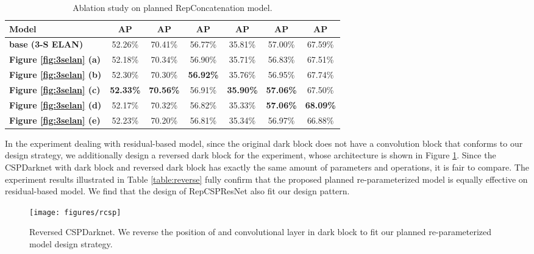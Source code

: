 \documentclass[10pt,twocolumn,letterpaper]{article}
\begin{document}
		
		
		\begin{table}[h]
			\centering
			\begin{threeparttable}[h]
				\footnotesize
				\caption{Ablation study on planned RepConcatenation model.}
				\label{table:stack}
				\setlength\tabcolsep{1.0pt}
				\begin{tabular}{lcccccc}
					\toprule
					\textbf{Model} & \textbf{AP} & \textbf{AP} & \textbf{AP} & \textbf{AP} & \textbf{AP} & \textbf{AP}  \\	
					\midrule
					\textbf{base (3-S ELAN)} & 52.26\% & 70.41\% & 56.77\% & 35.81\% & 57.00\% & 67.59\% \\
					\textbf{Figure \ref{fig:3selan} (a)} & 52.18\% & 70.34\% & 56.90\% & 35.71\% & 56.83\% & 67.51\% \\
					\textbf{Figure \ref{fig:3selan} (b)} & 52.30\% & 70.30\% & \textbf{56.92\%} & 35.76\% & 56.95\% & 67.74\% \\
					\textbf{Figure \ref{fig:3selan} (c)} & \textbf{52.33\%} & \textbf{70.56\%} & 56.91\% & \textbf{35.90\%} & \textbf{57.06\%} & 67.50\% \\
					\textbf{Figure \ref{fig:3selan} (d)} & 52.17\% & 70.32\% & 56.82\% & 35.33\% & \textbf{57.06\%} & \textbf{68.09\%} \\
					\textbf{Figure \ref{fig:3selan} (e)} & 52.23\% & 70.20\% & 56.81\% & 35.34\% & 56.97\% & 66.88\% \\
					\bottomrule
				\end{tabular}
\end{threeparttable}
		\end{table}
		
		In the experiment dealing with residual-based model, since the original dark block does not have a  convolution block that conforms to our design strategy, we additionally design a reversed dark block for the experiment, whose architecture is shown in Figure \ref{fig:rcsp}. Since the CSPDarknet with dark block and reversed dark block has exactly the same amount of parameters and operations, it is fair to compare. The experiment results illustrated in Table \ref{table:reverse} fully confirm that the proposed planned re-parameterized model is equally effective on residual-based model. We find that the design of RepCSPResNet \cite{xu2022pp} also fit our design pattern.
		
		
		
\begin{figure}[h]
			\begin{center}
				\texttt{[image: figures/rcsp]}
			\end{center}
			\caption{Reversed CSPDarknet. We reverse the position of  and  convolutional layer in dark block to fit our planned re-parameterized model design strategy.}
			\label{fig:rcsp}
\end{figure}
		
\end{document}
